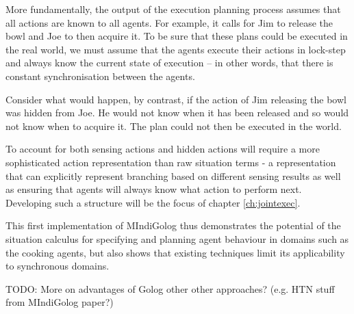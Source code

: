More fundamentally, the output of the execution planning process assumes
that all actions are known to all agents. For example, it calls for
Jim to release the bowl and Joe to then acquire it. To be sure that
these plans could be executed in the real world, we must assume that
the agents execute their actions in lock-step and always know the
current state of execution -- in other words, that there is constant
synchronisation between the agents.

Consider what would happen, by contrast, if the action of Jim releasing
the bowl was hidden from Joe. He would not know when it has been released
and so would not know when to acquire it. The plan could not then
be executed in the world.

To account for both sensing actions and hidden actions will require
a more sophisticated action representation than raw situation terms
- a representation that can explicitly represent branching based on
different sensing results as well as ensuring that agents will always
know what action to perform next. Developing such a structure will
be the focus of chapter \ref{ch:jointexec}.

This first implementation of MIndiGolog thus demonstrates the potential
of the situation calculus for specifying and planning agent behaviour
in domains such as the cooking agents, but also shows that existing
techniques limit its applicability to synchronous domains.

TODO: More on advantages of Golog other other approaches? (e.g. HTN
stuff from MIndiGolog paper?)

